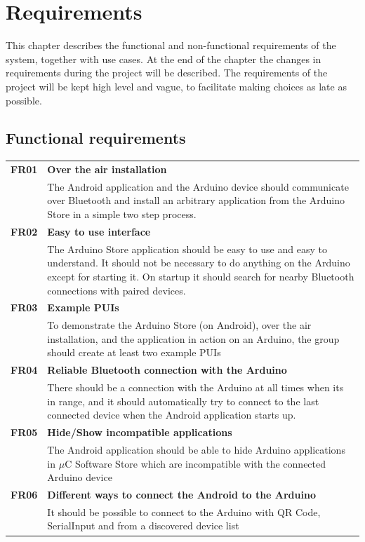 \chapter{Requirements}
This chapter describes the functional and non-functional requirements of the system, together with use cases. At the end of the chapter the changes in requirements during the project will be described.
The requirements of the project will be kept high level and vague, to facilitate making choices as late as possible.

\section{Functional requirements}
	\begin{table}[H]
	\begin{tabularx}{\linewidth}{lX}

		\textbf{FR01} & \textbf{Over the air installation}\\
 		              & The Android application and the Arduino device should communicate over 
                        Bluetooth and install an arbitrary application from the Arduino Store in a simple two step process.\\

		\textbf{FR02} & \textbf{Easy to use interface}\\
                      & The Arduino Store application should be easy to use and easy to understand. It should not be necessary to do anything on the Arduino except for starting it. On startup it should search for nearby Bluetooth connections with paired devices.\\

 		\textbf{FR03} & \textbf{Example PUIs}\\
                      & To demonstrate the Arduino Store (on Android), over the air installation, and the application in action on an Arduino, the group should create at least two example PUIs \\

		\textbf{FR04} & \textbf{Reliable Bluetooth connection with the Arduino}\\
                      & There should be a connection with the Arduino at all times when its in range, and it should automatically try to connect to the last connected device when the Android application starts up.\\

        \textbf{FR05} & \textbf{Hide/Show incompatible applications}\\
                      & The Android application should be able to hide Arduino applications in $\mu$C Software Store which are incompatible with the connected Arduino device\\

        \textbf{FR06} & \textbf{Different ways to connect the Android to the Arduino}\\
                      & It should be possible to connect to the Arduino with QR Code, SerialInput and from a discovered device list\\

	\end{tabularx}
	\end{table}

